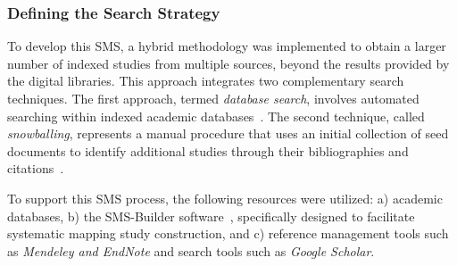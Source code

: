\subsubsection{Defining the Search Strategy}\label{subsubsec:estrategia-busqueda}

To develop this SMS, a hybrid methodology was implemented to obtain a larger number of indexed studies from multiple sources, beyond the results provided by the digital libraries. This approach integrates two complementary search techniques. The first approach, termed \textit{database search}, involves automated searching within indexed academic databases~\cite{Jalai-01}. The second technique, called \textit{snowballing}, represents a manual procedure that uses an initial collection of seed documents to identify additional studies through their bibliographies and citations~\cite{Jalai-01,Goodman-01}.

To support this SMS process, the following resources were utilized: a) academic databases, b) the SMS-Builder software~\cite{Candela2022100935}, specifically designed to facilitate systematic mapping study construction, and c) reference management tools such as \textit{Mendeley and EndNote} and search tools such as \textit{Google Scholar}.
